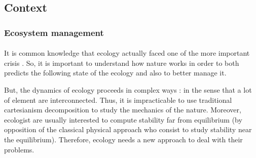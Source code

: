 \documentclass{article}
\begin{document}
\newpage


\subsection*{Context}

\subsubsection*{Ecosystem management}


\paragraph{} %

It is common knowledge that ecology actually faced one of the more important crisis \cite{oosthoek_humanity_2005}. So, it is important to understand how nature works in order to both predicts the following state of the ecology and also to better manage it.

But, the dynamics of ecology proceeds in complex ways : in the sense that a lot of element are interconnected. Thus, it is impracticable to use traditional cartesianism decomposition to study the mechanics of the nature. Moreover, ecologist are usually interested to compute stability far from equilibrium (by opposition of the classical physical approach who consist to study stability near the equilibrium). %
Therefore, ecology needs a new approach to deal with their problems. 
\end{document}
